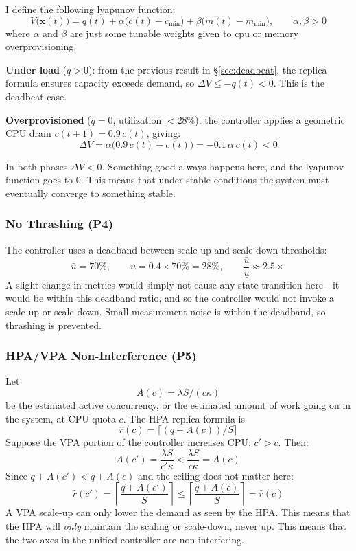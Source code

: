 \documentclass[twocolumn]{article}
\begin{document}
I define the following lyapunov function:
$$V\!\bigl(\mathbf{x}(t)\bigr) = q(t) + \alpha\bigl(c(t) - c_{\min}\bigr) + \beta\bigl(m(t) - m_{\min}\bigr), \qquad \alpha, \beta > 0$$
where \(\alpha\) and \(\beta\) are just some tunable weights given to cpu or memory overprovisioning.

\textbf{Under load} (\(q > 0\)): from the previous result in \S\ref{sec:deadbeat}, the replica formula ensures capacity exceeds demand, so \(\Delta V \leq -q(t) < 0\). This is the deadbeat case.

\textbf{Overprovisioned} (\(q = 0\), utilization \(< 28\%\)): the controller applies a geometric CPU drain \(c(t+1) = 0.9\, c(t)\), giving:
$$\Delta V = \alpha\bigl(0.9\,c(t) - c(t)\bigr) = -0.1\,\alpha\,c(t) < 0$$

In both phases \(\Delta V < 0\). Something good always happens here, and the lyapunov function goes to 0. This means that under stable conditions the system must eventually converge to something stable.
\subsubsection{No Thrashing (P4)}
\label{sec:org96a9768}

The controller uses a deadband between scale-up and scale-down thresholds:
$$\bar{u} = 70\%, \qquad \underline{u} = 0.4 \times 70\% = 28\%, \qquad \frac{\bar{u}}{\underline{u}} \approx 2.5\times$$
A slight change in metrics would simply not cause any state transition here - it would be within this deadband ratio, and so the controller would not invoke a scale-up or scale-down. Small measurement noise is within the deadband, so thrashing is prevented.
\subsubsection{HPA/VPA Non-Interference (P5)}
\label{sec:org12ea71a}

Let
$$A(c) = \lambda S / (c\kappa)$$
be the estimated active concurrency, or the estimated amount of work going on in the system, at CPU quota \(c\).
The HPA replica formula is
$$\hat{r}(c) = \lceil (q + A(c))/S \rceil$$
Suppose the VPA portion of the controller increases CPU: \(c' > c\). Then:
$$A(c') = \frac{\lambda S}{c'\kappa} < \frac{\lambda S}{c\kappa} = A(c)$$
Since \(q + A(c') < q + A(c)\) and the ceiling does not matter here:
$$\hat{r}(c') = \left\lceil \frac{q + A(c')}{S} \right\rceil \leq \left\lceil \frac{q + A(c)}{S} \right\rceil = \hat{r}(c)$$
A VPA scale-up can only lower the demand as seen by the HPA. This means that the HPA will \emph{only} maintain the scaling or scale-down, never up. This means that the two axes in the unified controller are non-interfering.
\end{document}
